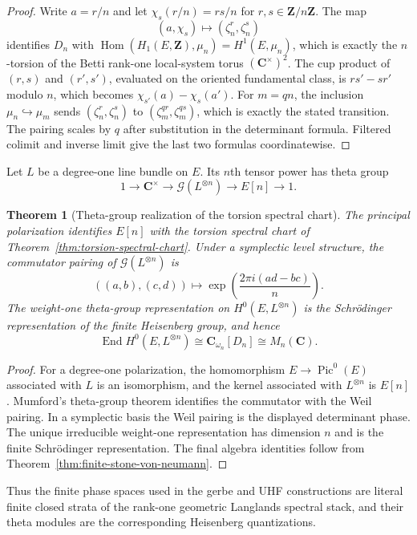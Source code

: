 \documentclass[11pt]{amsart}
\numberwithin{equation}{section}
\newtheorem{theorem}{Theorem}[section]
\theoremstyle{definition}
\newcommand{\Z}{\mathbf Z}
\newcommand{\C}{\mathbf C}
\newcommand{\Hom}{\operatorname{Hom}}
\newcommand{\End}{\operatorname{End}}
\begin{document}
\begin{proof}
Write $a=r/n$ and let $\chi_s(r/n)=rs/n$ for $r,s\in\Z/n\Z$.
The map
\[
(a,\chi_s)\longmapsto(\zeta_n^r,\zeta_n^s)
\]
identifies $D_n$ with
$\Hom(H_1(E,\Z),\mu_n)=H^1(E,\mu_n)$, which is exactly the $n$-torsion
of the Betti rank-one local-system torus $(\C^\times)^2$.  The cup product
of $(r,s)$ and $(r',s')$, evaluated on the oriented fundamental class, is
$rs'-sr'$ modulo $n$, which becomes
$\chi_{s'}(a)-\chi_s(a')$.  For $m=qn$, the inclusion $\mu_n\hookrightarrow\mu_m$ sends
$(\zeta_n^r,\zeta_n^s)$ to
$(\zeta_m^{qr},\zeta_m^{qs})$, which is exactly the stated transition.
The pairing scales by $q$ after substitution in the determinant formula.
Filtered colimit and inverse limit give the last two formulas
coordinatewise.
\end{proof}

Let $L$ be a degree-one line bundle on $E$.  Its $n$th tensor power has
theta group
\[
1\longrightarrow\C^\times
\longrightarrow\mathcal G(L^{\otimes n})
\longrightarrow E[n]
\longrightarrow1.
\]

\begin{theorem}[Theta-group realization of the torsion spectral chart]
\label{thm:theta-group-spectral-chart}
The principal polarization identifies $E[n]$ with the torsion spectral
chart of Theorem~\ref{thm:torsion-spectral-chart}.  Under a symplectic level
structure, the commutator pairing of $\mathcal G(L^{\otimes n})$ is
\[
((a,b),(c,d))\longmapsto\exp\!\left(\frac{2\pi i(ad-bc)}n\right).
\]
The weight-one theta-group representation on
$H^0(E,L^{\otimes n})$ is the Schr\"odinger representation of the finite
Heisenberg group, and hence
\[
\End H^0(E,L^{\otimes n})
\cong
\C_{\omega_n}[D_n]
\cong M_n(\C).
\]
\end{theorem}

\begin{proof}
For a degree-one polarization, the homomorphism
$E\to\operatorname{Pic}^0(E)$ associated with $L$ is an isomorphism, and
the kernel associated with $L^{\otimes n}$ is $E[n]$.  Mumford's theta-group
theorem identifies the commutator with the Weil pairing.  In a symplectic
basis the Weil pairing is the displayed determinant phase.  The unique
irreducible weight-one representation has dimension $n$ and is the finite
Schr\"odinger representation.  The final algebra identities follow from
Theorem~\ref{thm:finite-stone-von-neumann}.
\end{proof}

Thus the finite phase spaces used in the gerbe and UHF constructions are
literal finite closed strata of the rank-one geometric Langlands spectral
stack, and their theta modules are the corresponding Heisenberg
quantizations.
\end{document}
